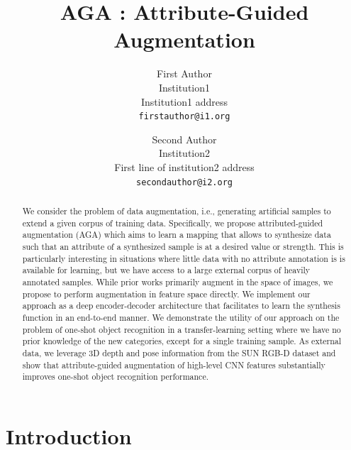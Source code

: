 \documentclass[10pt,twocolumn,letterpaper]{article}
\begin{document}
\title{AGA : Attribute-Guided Augmentation}

\author{First Author\\
Institution1\\
Institution1 address\\
{\tt\small firstauthor@i1.org}
\and
Second Author\\
Institution2\\
First line of institution2 address\\
{\tt\small secondauthor@i2.org}
}

\maketitle

\begin{abstract}
We consider the problem of data augmentation, i.e., generating artificial
samples to extend a given corpus of training data. Specifically, we propose
attributed-guided augmentation (AGA) which aims to learn a mapping
that allows to synthesize data such that an attribute of a synthesized sample 
is at a desired value or strength. This is particularly interesting in situations 
where little data with no attribute annotation is is available for learning, but 
we have access to a large external corpus of heavily annotated samples. 
While prior works primarily augment in the space of images,
we propose to perform augmentation in feature space directly.
We implement our approach as a deep encoder-decoder architecture that 
facilitates to learn the synthesis function in an end-to-end manner. 
We demonstrate the utility of our approach on the problem of 
one-shot object recognition in a transfer-learning setting where
we have no prior knowledge of the new categories, except for 
a single training sample.
As external data, we leverage 3D depth and pose information from the 
SUN RGB-D dataset and show that attribute-guided augmentation of
high-level CNN features substantially improves one-shot object recognition 
performance.
\end{abstract}

\section{Introduction}
\label{section:introduction}
\end{document}
